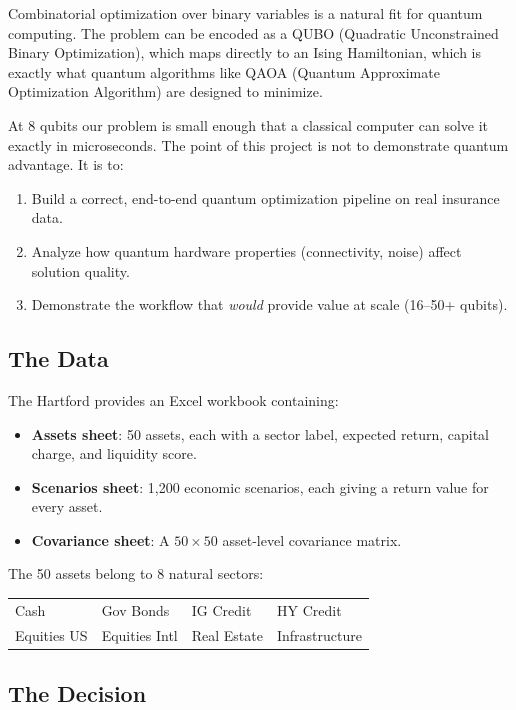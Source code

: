 \documentclass[12pt, a4paper]{article}
\begin{document}
Combinatorial optimization over binary variables is a natural fit for quantum
computing. The problem can be encoded as a QUBO (Quadratic Unconstrained Binary
Optimization), which maps directly to an Ising Hamiltonian, which is exactly
what quantum algorithms like QAOA (Quantum Approximate Optimization Algorithm)
are designed to minimize.

At 8 qubits our problem is small enough that a classical computer can solve it
exactly in microseconds. The point of this project is not to demonstrate quantum
advantage. It is to:

\begin{enumerate}
    \item Build a correct, end-to-end quantum optimization pipeline on real insurance data.
    \item Analyze how quantum hardware properties (connectivity, noise) affect solution quality.
    \item Demonstrate the workflow that \textit{would} provide value at scale (16--50+ qubits).
\end{enumerate}

\subsection{The Data}

The Hartford provides an Excel workbook containing:

\begin{itemize}
    \item \textbf{Assets sheet}: 50 assets, each with a sector label, expected return, capital charge, and liquidity score.
    \item \textbf{Scenarios sheet}: 1{,}200 economic scenarios, each giving a return value for every asset.
    \item \textbf{Covariance sheet}: A $50 \times 50$ asset-level covariance matrix.
\end{itemize}

The 50 assets belong to 8 natural sectors:
\begin{center}
\begin{tabular}{llll}
\toprule
Cash & Gov Bonds & IG Credit & HY Credit \\
Equities US & Equities Intl & Real Estate & Infrastructure \\
\bottomrule
\end{tabular}
\end{center}

\subsection{The Decision}
\end{document}
